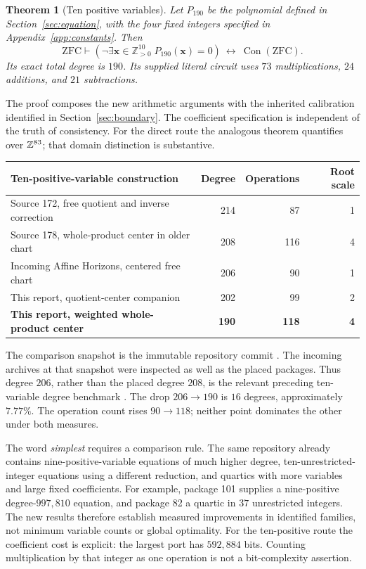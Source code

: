 \documentclass[11pt]{article}
\newtheorem{theorem}{Theorem}[section]
\theoremstyle{remark}
\newcommand{\Z}{\mathbb Z}
\newcommand{\Zpos}{\mathbb Z_{>0}}
\newcommand{\Con}{\operatorname{Con}}
\newcommand{\ZFC}{\mathrm{ZFC}}
\begin{document}
\begin{theorem}[Ten positive variables]\label{thm:principal}
Let \(P_{190}\) be the polynomial defined in Section~\ref{sec:equation},
with the four fixed integers specified in Appendix~\ref{app:constants}.
Then
\[
 \ZFC\vdash
 \left(\neg\exists\boldsymbol x\in\Zpos^{10}\;
                      P_{190}(\boldsymbol x)=0\right)
 \ \longleftrightarrow\ \Con(\ZFC).
\]
Its exact total degree is \(190\). Its supplied literal circuit uses
\(73\) multiplications, \(24\) additions, and \(21\) subtractions.
\end{theorem}

The proof composes the new arithmetic arguments with the inherited
calibration identified in Section~\ref{sec:boundary}.
The coefficient specification is independent of the truth of consistency.
For the direct route the analogous theorem quantifies over
\(\Z^{\DirectVariables}\); that domain distinction is substantive.

\begin{center}
\begin{tabular}{lrrr}
\toprule
Ten-positive-variable construction & Degree & Operations & Root scale\\
\midrule
Source 172, free quotient and inverse correction & 214 & 87 & 1\\
Source 178, whole-product center in older chart & 208 & 116 & 4\\
Incoming Affine Horizons, centered free chart & 206 & 90 & 1\\
This report, quotient-center companion & 202 & 99 & 2\\
\textbf{This report, weighted whole-product center} & \textbf{190} &
 \textbf{118} & \textbf{4}\\
\bottomrule
\end{tabular}
\end{center}

The comparison snapshot is the immutable repository commit
.
The incoming archives at that snapshot were inspected as well as the
placed packages. Thus degree \(206\), rather than the placed
degree \(208\), is the relevant preceding ten-variable degree benchmark
\cite{source172,source178,incomingAffine}.
The drop \(206\to190\) is \(16\) degrees, approximately \(7.77\%\).
The operation count rises \(90\to118\); neither point dominates the
other under both measures.

The word \emph{simplest} requires a comparison rule. The same repository
already contains nine-positive-variable equations of much higher degree,
ten-unrestricted-integer equations using a different reduction, and
quartics with more variables and large fixed coefficients.
For example, package 101 supplies a nine-positive degree-\(997{,}810\)
equation, and package 82 a quartic in \(37\) unrestricted integers.
The new results therefore establish measured improvements in identified
families, not minimum variable counts or global optimality.
For the ten-positive route the coefficient cost is explicit:
the largest port has \(592{,}884\) bits. Counting multiplication by that
integer as one operation is not a bit-complexity assertion.
\end{document}
